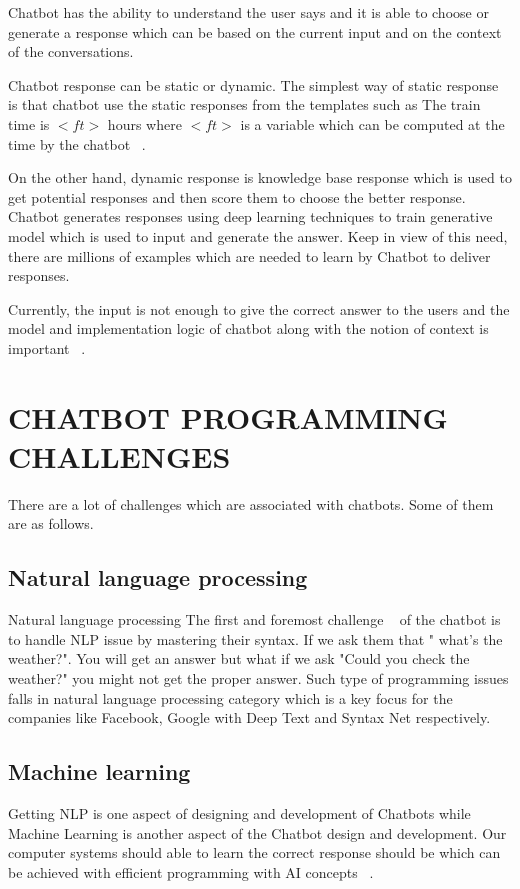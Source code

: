 \documentclass[conference]{IEEEtran}
\begin{document}
Chatbot has the ability to understand the user says and it is able to choose or generate a response which can be based on the current input and on the context of the conversations.

Chatbot response can be static or dynamic. The simplest way of static response is that chatbot use the static responses from the templates such as The train time is $<ft>$ hours where $<ft>$ is a variable which can be computed at the time by the chatbot ~\cite{b3}.

On the other hand, dynamic response is knowledge base response which is used to get potential responses and then score them to choose the better response. Chatbot generates responses using deep learning techniques to train generative model which is used to input and generate the answer. Keep in view of this need, there are millions of examples which are needed to learn by Chatbot to deliver responses.

Currently, the input is not enough to give the correct answer to the users and the model and implementation logic of chatbot along with the notion of context is important ~\cite{b4, b5, b6}.

\section{CHATBOT PROGRAMMING CHALLENGES}
There are a lot of challenges which are associated with chatbots. Some of them are as follows.

\subsection{Natural language processing}\label{AA}
Natural language processing The first and foremost challenge ~\cite{b7} of the chatbot is to handle NLP issue by mastering their syntax. If we ask them that " what's the weather?". You will get an answer but what if we ask "Could you check the weather?" you might not get the proper answer. Such type of programming issues falls in natural language processing category which is a key focus for the companies like Facebook, Google with Deep Text and Syntax Net respectively.

\subsection{Machine learning}
Getting NLP is one aspect of designing and development of Chatbots while Machine Learning is another aspect of the Chatbot design and development. Our computer systems should able to learn the correct response should be which can be achieved with efficient programming with AI concepts ~\cite{b8}.
\end{document}
